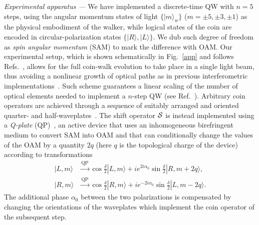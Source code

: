 \textit{Experimental apparatus ---}
We have implemented a discrete-time \ac{QW} with $n=5$ steps, using the angular momentum states of light $\{|m\rangle_w\}$ ($m=\pm 5, \pm 3, \pm 1$) as the physical embodiment of the walker, while logical states of the coin are encoded in circular-polarization states $\{|R\rangle, |L\rangle\}$. We dub such degree of freedom as {\it spin angular momentum} (SAM) to mark the difference with OAM. Our experimental setup, which is shown schematically in Fig.~\ref{app} and follows Refs.~\cite{cardano2015quantum,cardano2016statistical}, allows for the full coin-walk evolution to take place in a single light beam, thus avoiding a nonlinear growth of optical paths as in previous interferometric implementations~\cite{zhang2010implementation,goyal2013implementing,cardano2015quantum}. Such scheme guarantees a linear scaling of the number of optical elements needed to implement a $n$-step QW (see Ref.~\cite{SI}). Arbitrary coin operators are achieved through a sequence of suitably arranged and oriented quarter- and half-waveplates~\cite{simon1990minimal}. The shift operator ${\mathcal{S}}$ is instead implemented using a \emph{Q-plate} (QP)~\cite{marrucci2006optical}, an active device that uses an inhomogeneous birefringent medium to convert SAM into OAM  and that can conditionally change the values of the OAM by a quantity $2q$ (here $q$ is the topological charge of the device) according to transformations 
\begin{equation}
\begin{aligned}
|L,m\rangle&\stackrel{\text{QP}}{\longrightarrow} \cos{ \frac{\delta}{2}}|L,m\rangle + i e^{2 i \alpha_0}\sin{\frac{\delta}{2}}|R,m+2q\rangle,\\
|R,m\rangle&\stackrel{\text{QP}}{\longrightarrow} \cos{ \frac{\delta}{2}}|R,m\rangle + i e^{-2 i \alpha_0}\sin{\frac{\delta}{2}}|L,m-2q\rangle.
\end{aligned}
\end{equation}
The additional phase $\alpha_0$ between the two polarizations is compensated by changing the orientations of the waveplates which implement the coin operator of the subsequent step.

